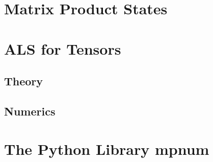 \section{Matrix Product States}
\label{sec:tensors.mps}


\section{ALS for Tensors}

\subsection{Theory}
\subsection{Numerics}

\section{The Python Library mpnum}

